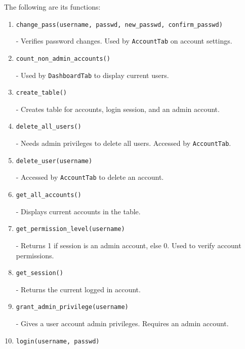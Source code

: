 \documentclass[12pt,a4paper]{article}
\begin{document}
        The following are its functions:
        \begin{enumerate}
            \item[\ding{118}]\texttt{change\_pass(username, passwd, new\_passwd, confirm\_passwd)}

                - Verifies password changes. Used by \texttt{AccountTab} on 
                account settings.

            \item[\ding{118}]\texttt{count\_non\_admin\_accounts()}

                - Used by \texttt{DashboardTab} to display current users.

            \item[\ding{118}]\texttt{create\_table()}

                - Creates table for accounts, login session, and an admin account.

            \item[\ding{118}]\texttt{delete\_all\_users()}

                - Needs admin privileges to delete all users. Accessed by 
                \texttt{AccountTab}.

            \item[\ding{118}]\texttt{delete\_user(username)}

                - Accessed by \texttt{AccountTab} to delete an account.

            \item[\ding{118}]\texttt{get\_all\_accounts()}

                - Displays current accounts in the table.

            \item[\ding{118}]\texttt{get\_permission\_level(username)}

                - Returns 1 if session is an admin account, else 0. Used to verify 
                account permissions.

            \item[\ding{118}]\texttt{get\_session()}

                - Returns the current logged in account.

            \item[\ding{118}]\texttt{grant\_admin\_privilege(username)}

                - Gives a user account admin privileges. Requires an admin account.

            \item[\ding{118}]\texttt{login(username, passwd)}


\end{enumerate}
\end{document}
